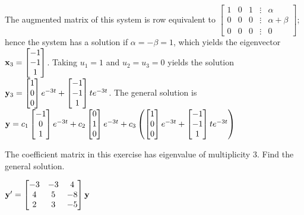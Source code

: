 \documentclass{ximera}
\begin{document}
\begin{problem}
\begin{solution}
The augmented matrix of this system is row equivalent to
$  \begin{bmatrix}1&0&1&\vdots&\alpha\\0&0&0&
\vdots&\alpha+\beta\\0&0&0&\vdots&0 \end{bmatrix}$;
hence the system
has a solution if $\alpha=-\beta=1$, which yields the eigenvector
${\bf x}_3= \begin{bmatrix}-1\\-1\\1 \end{bmatrix}$. Taking $u_1=1$  and $u_2=u_3=0$
yields the solution
${\bf y}_3= \begin{bmatrix}1\\0\\0 \end{bmatrix}e^{-3t}+ \begin{bmatrix}-1\\-1\\1 \end{bmatrix}te^{-3t}$.
The general solution is
${\bf
y}= c_1 \begin{bmatrix}-1\\0\\1 \end{bmatrix}e^{-3t}+c_2 \begin{bmatrix}0\\1\\0 \end{bmatrix}e^{-3t}+c_3\left
( \begin{bmatrix}1\\0\\0 \end{bmatrix}e^{-3t}+ \begin{bmatrix}-1\\-1\\1 \end{bmatrix}te^{-3t}\right)$
\end{solution}
 \end{problem}

 \begin{problem}\label{exer:10.5.31}  
 The coefficient matrix in this exercise
has eigenvalue of multiplicity $3$. Find the
general solution.

$ {\bf y}'
= \begin{bmatrix}-3&-3&4\\4&5&-8\\2&3&-5\end{bmatrix}\bf y$
 \end{problem}
\end{document}
